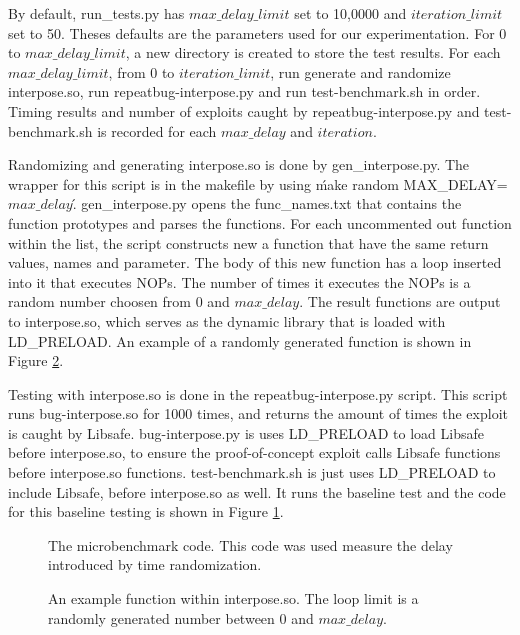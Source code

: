 \documentclass[letterpaper,twocolumn,10pt]{article}
\begin{document}
By default, run\_tests.py has $max\_delay\_limit$ set to 10,0000 and $iteration\_limit$ set to 50.  Theses defaults are the parameters used for our experimentation. For 0 to $max\_delay\_limit$, a new directory is created to store the test results.  For each $max\_delay\_limit$, from 0 to $iteration\_limit$, run generate and randomize interpose.so, run repeatbug-interpose.py and run test-benchmark.sh in order.  Timing results and number of exploits caught by repeatbug-interpose.py and test-benchmark.sh is recorded for each $max\_delay$ and $iteration$.

Randomizing and generating interpose.so is done by gen\_interpose.py.  The wrapper for this script is in the makefile by using \'make random MAX\_DELAY=$max\_delay$\'.  gen\_interpose.py opens the func\_names.txt that contains the function prototypes and parses the functions.  For each uncommented out function within the list, the script constructs new a function that have the same return values, names and parameter.  The body of this new function has a loop inserted into it that executes NOPs.  The number of times it executes the NOPs is a random number choosen from 0 and $max\_delay$.  The result functions are output to interpose.so, which serves as the dynamic library that is loaded with LD\_PRELOAD.  An example of a randomly generated function is shown in Figure \ref{fig_interpose}.

Testing with interpose.so is done in the repeatbug-interpose.py script.  This script runs bug-interpose.so for 1000 times, and returns the amount of times the exploit is caught by Libsafe.  bug-interpose.py is uses LD\_PRELOAD to load Libsafe before interpose.so, to ensure the proof-of-concept exploit calls Libsafe functions before interpose.so functions. test-benchmark.sh is just uses LD\_PRELOAD to include Libsafe, before interpose.so as well.  It runs the baseline test and the code for this baseline testing is shown in Figure \ref{fig_baseline}.



\begin{figure}

\caption{The microbenchmark code. This code was used measure the delay introduced by time randomization.}
\label{fig_baseline}
\end{figure}

\begin{figure}

\caption{An example function within interpose.so. The loop limit is a randomly generated number between 0 and $max\_delay$.}
\label{fig_interpose}
\end{figure}
\end{document}
